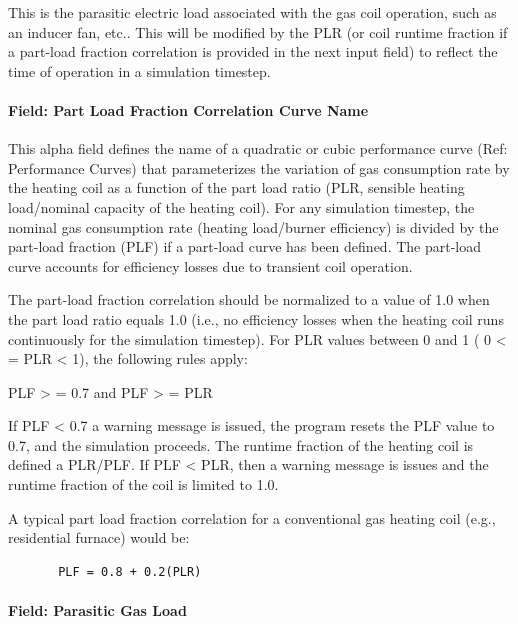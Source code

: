 This is the parasitic electric load associated with the gas coil operation, such as an inducer fan, etc.. This will be modified by the PLR (or coil runtime fraction if a part-load fraction correlation is provided in the next input field) to reflect the time of operation in a simulation timestep.

\paragraph{Field: Part Load Fraction Correlation Curve Name}\label{field-part-load-fraction-correlation-curve-name}

This alpha field defines the name of a quadratic or cubic performance curve (Ref: Performance Curves) that parameterizes the variation of gas consumption rate by the heating coil as a function of the part load ratio (PLR, sensible heating load/nominal capacity of the heating coil). For any simulation timestep, the nominal gas consumption rate (heating load/burner efficiency) is divided by the part-load fraction (PLF) if a part-load curve has been defined. The part-load curve accounts for efficiency losses due to transient coil operation.

The part-load fraction correlation should be normalized to a value of 1.0 when the part load ratio equals 1.0 (i.e., no efficiency losses when the heating coil runs continuously for the simulation timestep). For PLR values between 0 and 1 ( 0 \textless{} = PLR \textless{} 1), the following rules apply:

PLF \textgreater{} = 0.7 and PLF \textgreater{} = PLR

If PLF \textless{} 0.7 a warning message is issued, the program resets the PLF value to 0.7, and the simulation proceeds. The runtime fraction of the heating coil is defined a PLR/PLF. If PLF \textless{} PLR, then a warning message is issues and the runtime fraction of the coil is limited to 1.0.

A typical part load fraction correlation for a conventional gas heating coil (e.g., residential furnace) would be:

\begin{lstlisting}
       PLF = 0.8 + 0.2(PLR)
\end{lstlisting}

\paragraph{Field: Parasitic Gas Load}\label{field-parasitic-gas-load}

